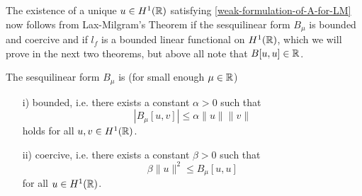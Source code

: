The existence of a unique $u \in H^{1}(\mathbb{R})$ satisfying \eqref{weak-formulation-of-A-for-LM} now follows from Lax-Milgram's Theorem if the sesquilinear form $B_{\mu}$ is bounded and coercive and if $l_{f}$ is a bounded linear functional on $H^{1}(\mathbb{R})$, which we will prove in the next two theorems, but above all note that $B[u, u] \in \mathbb{R}$.
\begin{theorem} \label{2.1:thm-LaxMilgram}
	The sesquilinear form $B_{\mu}$ is (for small enough $\mu \in \mathbb{R}$)
	\begin{enumerate}
		\item[i)] bounded, i.e. there exists a constant $\alpha > 0$ such that
			\[ \left| B_{\mu}[u,v] \right| \leq \alpha \|u\| \|v\| \]
			holds for all $u, v \in H^{1}(\mathbb{R})$.
		\item[ii)] coercive, i.e. there exists a constant $\beta > 0$ such that
			\[ \beta \|u\|^{2} \leq B_{\mu}[u, u] \]
			for all $u \in H^{1}(\mathbb{R})$.
	\end{enumerate} 


\end{theorem}

